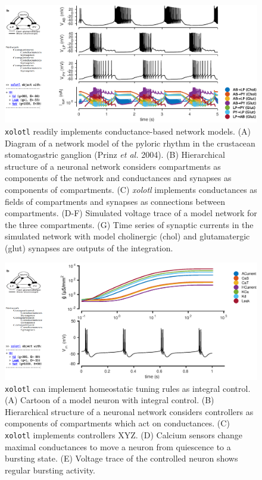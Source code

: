 \documentclass[utf8]{frontiersSCNS} %
\begin{document}
\begin{figure}
	\centering
	\includegraphics[width=1.0\linewidth]{gfx/figure_network}
	\caption{\texttt{xolotl} readily implements conductance-based network models. (A) Diagram of a network model of the pyloric rhythm in the crustacean stomatogastric ganglion (Prinz \textit{et al.} 2004). (B) Hierarchical structure of a neuronal network considers compartments as components of the network and conductances and synapses as components of compartments. (C) \textit{xolotl} implements conductances as fields of compartments and synapses as connections between compartments. (D-F) Simulated voltage trace of a model network for the three compartments. (G) Time series of synaptic currents in the simulated network with model cholinergic (chol) and glutamatergic (glut) synapses are outputs of the integration.}
	\label{fig:figurenetwork}
\end{figure}

\begin{figure}
	\centering
	\includegraphics[width=1.0\linewidth]{gfx/figure_integral_control}
	\caption{\texttt{xolotl} can implement homeostatic tuning rules as integral control. (A) Cartoon of a model neuron with integral control. (B) Hierarchical structure of a neuronal network considers controllers as components of compartments which act on conductances. (C) \texttt{xolotl} implements controllers XYZ. (D) Calcium sensors change maximal conductances to move a neuron from quiescence to a bursting state. (E) Voltage trace of the controlled neuron shows regular bursting activity.}
	\label{fig:figureintegralcontrol}
\end{figure}
\end{document}
